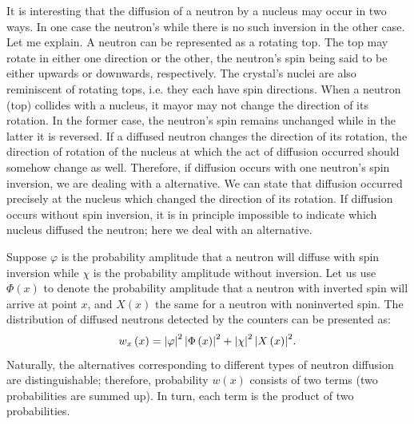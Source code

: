 It is interesting that the diffusion of a neutron by a nucleus may occur
in two ways. In one case the neutron's  while there is no such inversion in the other case. Let me explain. A neutron can be
represented as a rotating top. The top may rotate in either one direction
or the other, the neutron's spin being said to be either upwards or
downwards, respectively. The crystal's nuclei are also reminiscent of
rotating tops, i.e. they each have spin directions. When a neutron (top)
collides with a nucleus, it mayor may not change the direction of its
	rotation. In the former case, the neutron's spin remains unchanged while
in the latter it is reversed. If a diffused neutron changes the direction of
its rotation, the direction of rotation of the nucleus at which the act of
diffusion occurred should somehow change as well. Therefore, if
diffusion occurs with one neutron's spin inversion, we are dealing with
a  alternative. We can state that diffusion occurred
precisely at the nucleus which changed the direction of its rotation. If
diffusion occurs without spin inversion, it is in principle impossible to
indicate which nucleus diffused the neutron; here we deal with an
 alternative.


Suppose $\varphi$ is the probability amplitude that a neutron will diffuse
with spin inversion while $\chi$ is the probability amplitude without
inversion. Let us use $\Phi  (x)$ to denote the probability amplitude that
a neutron with inverted spin will arrive at point $x$, and $X  (x)$ the same for a neutron with noninverted spin. The distribution of diffused neutrons
detected by the counters can be presented as:
\begin{equation}%
w_{x} \, (x) =  \abs{\varphi }^{2}\, \abs{\Phi \, (x) }^{2}  + \abs{\chi}^{2} \, \abs{X \, (x)}^{2}.
\label{eq-5.11}
\end{equation}
Naturally, the alternatives corresponding to different types of neutron
diffusion are distinguishable; therefore, probability $w(x)$ consists of two
terms (two probabilities are summed up). In turn, each term is the
product of two probabilities.


